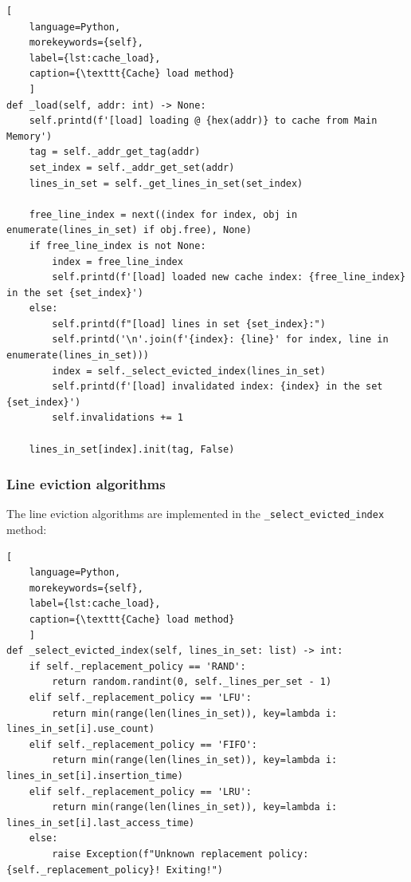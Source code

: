 \begin{center}
\centering
\begin{minipage}{\linewidth}
\begin{lstlisting}[
    language=Python,
	morekeywords={self},
    label={lst:cache_load},
    caption={\texttt{Cache} load method}
    ]
def _load(self, addr: int) -> None:
    self.printd(f'[load] loading @ {hex(addr)} to cache from Main Memory')
    tag = self._addr_get_tag(addr)
    set_index = self._addr_get_set(addr)
    lines_in_set = self._get_lines_in_set(set_index)

    free_line_index = next((index for index, obj in enumerate(lines_in_set) if obj.free), None)
    if free_line_index is not None:
        index = free_line_index
        self.printd(f'[load] loaded new cache index: {free_line_index} in the set {set_index}')
    else:
        self.printd(f"[load] lines in set {set_index}:")
        self.printd('\n'.join(f'{index}: {line}' for index, line in enumerate(lines_in_set)))
        index = self._select_evicted_index(lines_in_set)
        self.printd(f'[load] invalidated index: {index} in the set {set_index}')
        self.invalidations += 1

    lines_in_set[index].init(tag, False)
\end{lstlisting}
\end{minipage}
\end{center}

\subsubsection*{Line eviction algorithms}
\noindent The line eviction algorithms are implemented in the \texttt{\_select\_evicted\_index} method:

\begin{center}
\centering
\begin{minipage}{\linewidth}
\begin{lstlisting}[
    language=Python,
	morekeywords={self},
    label={lst:cache_load},
    caption={\texttt{Cache} load method}
    ]
def _select_evicted_index(self, lines_in_set: list) -> int:
    if self._replacement_policy == 'RAND':
        return random.randint(0, self._lines_per_set - 1)
    elif self._replacement_policy == 'LFU':
        return min(range(len(lines_in_set)), key=lambda i: lines_in_set[i].use_count)
    elif self._replacement_policy == 'FIFO':
        return min(range(len(lines_in_set)), key=lambda i: lines_in_set[i].insertion_time)
    elif self._replacement_policy == 'LRU':
        return min(range(len(lines_in_set)), key=lambda i: lines_in_set[i].last_access_time)
    else:
        raise Exception(f"Unknown replacement policy: {self._replacement_policy}! Exiting!")
\end{lstlisting}
\end{minipage}
\end{center}


